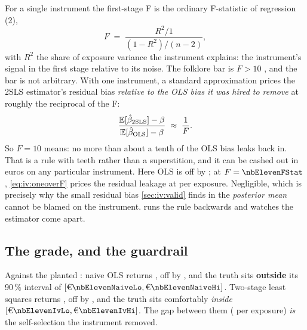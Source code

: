 For a single instrument the first-stage F is the ordinary F-statistic of regression (2),
%
\begin{equation}
  F \;=\; \frac{R^{2}/1}{(1 - R^{2})/(n - 2)},
  \label{eq:iv:F}
\end{equation}
%
with $R^2$ the share of exposure variance the instrument explains: the instrument's signal in the
first stage relative to its noise. The folklore bar is $F > 10$ \citep{staiger1997, stock2005}, and
the bar is not arbitrary. With one instrument, a standard approximation prices the 2SLS estimator's
residual bias \emph{relative to the OLS bias it was hired to remove} at roughly the reciprocal of
the F:
%
\begin{equation}
  \frac{\operatorname{\mathbb{E}}[\hat\beta_{\text{2SLS}}] - \beta}{\operatorname{\mathbb{E}}[\hat\beta_{\text{OLS}}] - \beta}
  \;\approx\; \frac{1}{F} .
  \label{eq:iv:oneoverF}
\end{equation}
%
So $F = 10$ means: no more than about a tenth of the OLS bias leaks back in. That is a rule with
teeth rather than a superstition, and it can be cashed out in euros on any particular instrument.
Here OLS is off by \eur{\nbElevenNaiveErr}; at $F = \nbElevenFStat$, \cref{eq:iv:oneoverF} prices
the residual leakage at \eur{\nbElevenFLeak} per exposure. Negligible, which is precisely why the
small residual bias \cref{sec:iv:valid} finds in the \emph{posterior mean} cannot be blamed on the
instrument.  runs the rule backwards and watches the estimator come apart.

\subsection*{The grade, and the guardrail}

Against the planted \eur{\nbElevenTrue}: naive OLS returns \eur{\nbElevenNaive}, off by
\eur{\nbElevenNaiveErr}, and the truth sits \textbf{outside} its 90\,\% interval of
$[\eur{\nbElevenNaiveLo}, \eur{\nbElevenNaiveHi}]$. Two-stage least squares returns
\eur{\nbElevenIvEst}, off by \eur{\nbElevenIvErr}, and the truth sits comfortably \emph{inside}
$[\eur{\nbElevenIvLo}, \eur{\nbElevenIvHi}]$. The gap between them (\eur{\nbElevenWedge} per
exposure) \emph{is} the self-selection the instrument removed.

